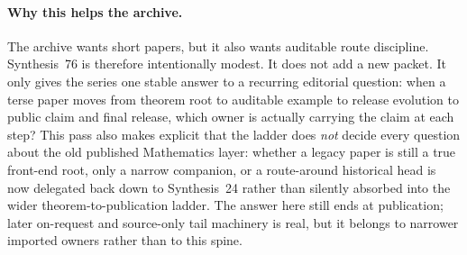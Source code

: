\documentclass[11pt]{article}
\begin{document}
\paragraph{Why this helps the archive.}
The archive wants short papers, but it also wants auditable route discipline.
Synthesis~76 is therefore intentionally modest.
It does not add a new packet.
It only gives the series one stable answer to a recurring editorial question: when a terse paper moves from theorem root to auditable example to release evolution to public claim and final release, which owner is actually carrying the claim at each step? This pass also makes explicit that the ladder does \emph{not} decide every question about the old published Mathematics layer: whether a legacy paper is still a true front-end root, only a narrow companion, or a route-around historical head is now delegated back down to Synthesis~24 rather than silently absorbed into the wider theorem-to-publication ladder. The answer here still ends at publication; later on-request and source-only tail machinery is real, but it belongs to narrower imported owners rather than to this spine.
\end{document}
